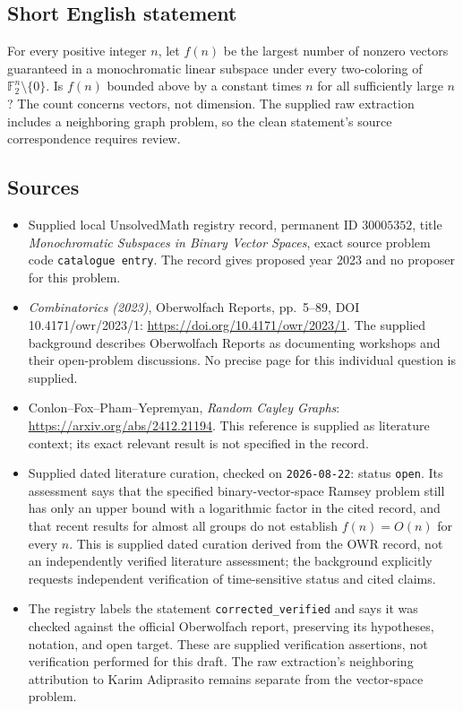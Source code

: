 \documentclass[11pt]{article}
\newcommand{\F}{\mathbb{F}}
\begin{document}
\subsection{Short English statement}
For every positive integer \(n\), let \(f(n)\) be the largest number of nonzero vectors guaranteed in a monochromatic linear subspace under every two-coloring of \(\F_2^n\setminus\{0\}\). Is \(f(n)\) bounded above by a constant times \(n\) for all sufficiently large \(n\)? The count concerns vectors, not dimension. The supplied raw extraction includes a neighboring graph problem, so the clean statement's source correspondence requires review.
\subsection{Sources}
\begin{itemize}
\item Supplied local UnsolvedMath registry record, permanent ID \(30005352\), title \emph{Monochromatic Subspaces in Binary Vector Spaces}, exact source problem code \texttt{catalogue entry}. The record gives proposed year 2023 and no proposer for this problem.
\item \emph{Combinatorics (2023)}, Oberwolfach Reports, pp.\ 5--89, DOI 10.4171/owr/2023/1: \url{https://doi.org/10.4171/owr/2023/1}. The supplied background describes Oberwolfach Reports as documenting workshops and their open-problem discussions. No precise page for this individual question is supplied.
\item Conlon--Fox--Pham--Yepremyan, \emph{Random Cayley Graphs}: \url{https://arxiv.org/abs/2412.21194}. This reference is supplied as literature context; its exact relevant result is not specified in the record.
\item Supplied dated literature curation, checked on \texttt{2026-08-22}: status \texttt{open}. Its assessment says that the specified binary-vector-space Ramsey problem still has only an upper bound with a logarithmic factor in the cited record, and that recent results for almost all groups do not establish \(f(n)=O(n)\) for every \(n\). This is supplied dated curation derived from the OWR record, not an independently verified literature assessment; the background explicitly requests independent verification of time-sensitive status and cited claims.
\item The registry labels the statement \texttt{corrected\_verified} and says it was checked against the official Oberwolfach report, preserving its hypotheses, notation, and open target. These are supplied verification assertions, not verification performed for this draft. The raw extraction's neighboring attribution to Karim Adiprasito remains separate from the vector-space problem.
\end{itemize}
\end{document}

